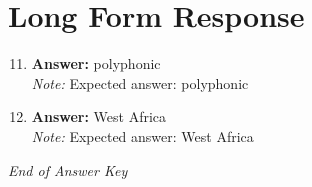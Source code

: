 \documentclass[12pt]{article}
\begin{document}
\section*{Long Form Response}
\begin{enumerate}[label=\arabic*.]
\setcounter{enumi}{10}
\item \textbf{Answer:} polyphonic
\\ \textit{Note:} Expected answer: polyphonic
\item \textbf{Answer:} West Africa
\\ \textit{Note:} Expected answer: West Africa
\end{enumerate}

\vfill
\noindent\textit{End of Answer Key}
\end{document}
